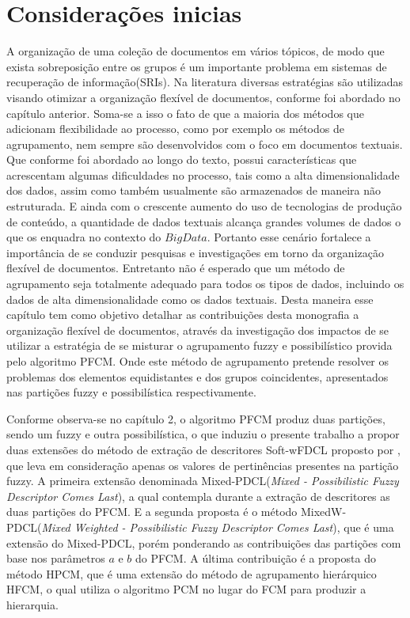 \section{Considerações inicias}
A organização de uma coleção de documentos em vários tópicos, de modo que exista sobreposição
entre os grupos é um importante problema em sistemas de recuperação de informação(SRIs). Na
literatura diversas estratégias são utilizadas visando otimizar a organização flexível de
documentos, conforme foi abordado no capítulo anterior. Soma-se a isso o fato de que a maioria dos
métodos que adicionam flexibilidade ao processo, como por exemplo  os métodos de agrupamento, nem
sempre são desenvolvidos com o foco em documentos textuais. Que conforme foi abordado ao longo do
texto, possui características que acrescentam algumas dificuldades no processo, tais como a alta
dimensionalidade dos dados, assim como também usualmente são armazenados de maneira não estruturada.
E ainda com o crescente aumento do uso de tecnologias de produção de conteúdo, a quantidade de dados
textuais alcança grandes volumes de dados o que os enquadra no contexto do $Big Data$. 
Portanto esse cenário fortalece a importância de se conduzir pesquisas e investigações em torno da
organização flexível de documentos. Entretanto não é esperado que um método de agrupamento seja
totalmente adequado para todos os tipos de dados, incluindo os dados de alta dimensionalidade como
os dados textuais\cite{Steinbach2004}. Desta maneira esse capítulo tem como objetivo detalhar as 
contribuições
desta monografia a organização flexível de documentos, através da investigação dos impactos de se
utilizar a estratégia de se misturar o agrupamento fuzzy e possibilístico provida pelo algoritmo
PFCM. Onde este método de agrupamento pretende resolver os problemas dos elementos equidistantes e 
dos grupos
coincidentes, apresentados nas partições fuzzy e possibilística respectivamente. 

Conforme observa-se no capítulo 2, o algoritmo PFCM produz duas
partições, sendo um fuzzy e outra possibilística, o que induziu o presente trabalho a propor duas extensões do
método de extração de descritores Soft-wFDCL proposto por \cite{Nogueira2013}, que leva em
consideração apenas os valores de pertinências presentes na partição fuzzy. A primeira extensão
denominada Mixed-PDCL({\it Mixed - Possibilistic Fuzzy Descriptor Comes Last\/}), 
a qual contempla durante a extração de descritores as duas partições do PFCM.
E a segunda proposta é o método 
MixedW-PDCL({\it Mixed Weighted - Possibilistic Fuzzy Descriptor Comes Last\/}), 
que é uma extensão do Mixed-PDCL, porém ponderando as
contribuições das partições com base nos parâmetros $a$ e $b$ do PFCM. A última contribuição é a
proposta do método HPCM, que é uma extensão do método de agrupamento hierárquico HFCM, o qual
utiliza o algoritmo PCM no lugar do FCM para produzir a hierarquia.


